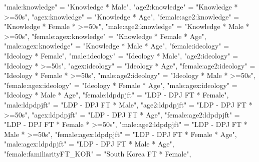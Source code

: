 \documentclass[
]{article}
\newenvironment{Shaded}{\begin{snugshade}}{\end{snugshade}}
\newcommand{\NormalTok}[1]{#1}
\newcommand{\StringTok}[1]{\textcolor[rgb]{0.31,0.60,0.02}{#1}}
\begin{document}
\begin{Shaded}
\begin{Highlighting}[]
              \StringTok{"male:knowledge"}\NormalTok{ =}\StringTok{ "Knowledge * Male"}\NormalTok{,}
              \StringTok{"age2:knowledge"}\NormalTok{ =}\StringTok{ "Knowledge * >=50s"}\NormalTok{,}
              \StringTok{"agex:knowledge"}\NormalTok{ =}\StringTok{ "Knowledge * Age"}\NormalTok{,}
              \StringTok{"female:age2:knowledge"}\NormalTok{ =}\StringTok{ "Knowledge * Female * >=50s"}\NormalTok{,}
              \StringTok{"male:age2:knowledge"}\NormalTok{ =}\StringTok{ "Knowledge * Male * >=50s"}\NormalTok{,}
              \StringTok{"female:agex:knowledge"}\NormalTok{ =}\StringTok{ "Knowledge * Female * Age"}\NormalTok{,}
              \StringTok{"male:agex:knowledge"}\NormalTok{ =}\StringTok{ "Knowledge * Male * Age"}\NormalTok{,}
              \StringTok{"female:ideology"}\NormalTok{ =}\StringTok{ "Ideology * Female"}\NormalTok{,}
              \StringTok{"male:ideology"}\NormalTok{ =}\StringTok{ "Ideology * Male"}\NormalTok{,}
              \StringTok{"age2:ideology"}\NormalTok{ =}\StringTok{ "Ideology * >=50s"}\NormalTok{,}
              \StringTok{"agex:ideology"}\NormalTok{ =}\StringTok{ "Ideology * Age"}\NormalTok{,}
              \StringTok{"female:age2:ideology"}\NormalTok{ =}\StringTok{ "Ideology * Female * >=50s"}\NormalTok{,}
              \StringTok{"male:age2:ideology"}\NormalTok{ =}\StringTok{ "Ideology * Male * >=50s"}\NormalTok{,}
              \StringTok{"female:agex:ideology"}\NormalTok{ =}\StringTok{ "Ideology * Female * Age"}\NormalTok{,}
              \StringTok{"male:agex:ideology"}\NormalTok{ =}\StringTok{ "Ideology * Male * Age"}\NormalTok{,}
              \StringTok{"female:ldpdpjft"}\NormalTok{ =}\StringTok{ "LDP - DPJ FT * Female"}\NormalTok{,}
              \StringTok{"male:ldpdpjft"}\NormalTok{ =}\StringTok{ "LDP - DPJ FT * Male"}\NormalTok{,}
              \StringTok{"age2:ldpdpjft"}\NormalTok{ =}\StringTok{ "LDP - DPJ FT * >=50s"}\NormalTok{,}
              \StringTok{"agex:ldpdpjft"}\NormalTok{ =}\StringTok{ "LDP - DPJ FT * Age"}\NormalTok{,}
              \StringTok{"female:age2:ldpdpjft"}\NormalTok{ =}\StringTok{ "LDP - DPJ FT * Female * >=50s"}\NormalTok{,}
              \StringTok{"male:age2:ldpdpjft"}\NormalTok{ =}\StringTok{ "LDP - DPJ FT * Male * >=50s"}\NormalTok{,}
              \StringTok{"female:agex:ldpdpjft"}\NormalTok{ =}\StringTok{ "LDP - DPJ FT * Female * Age"}\NormalTok{,}
              \StringTok{"male:agex:ldpdpjft"}\NormalTok{ =}\StringTok{ "LDP - DPJ FT * Male * Age"}\NormalTok{,}
              \StringTok{"female:familiarityFT_KOR"}\NormalTok{ =}\StringTok{ "South Korea FT * Female"}\NormalTok{,}

\end{Highlighting}
\end{Shaded}
\end{document}
